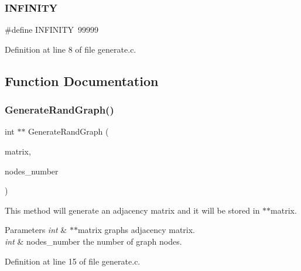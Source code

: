 \subsubsection{I\+N\+F\+I\+N\+I\+TY}
{\footnotesize\ttfamily \#define I\+N\+F\+I\+N\+I\+TY~99999}



Definition at line 8 of file generate.\+c.



\subsection{Function Documentation}
\mbox{\label{generate_8c_ae9f3169bfb4eb4fe0cf4032e32367c98}} 
\subsubsection{Generate\+Rand\+Graph()}
{\footnotesize\ttfamily int $\ast$$\ast$ Generate\+Rand\+Graph (\begin{DoxyParamCaption}\item[{int $\ast$$\ast$}]{matrix,  }\item[{int $\ast$}]{nodes\+\_\+number }\end{DoxyParamCaption})}



This method will generate an adjacency matrix and it will be stored in $\ast$$\ast$matrix. 


\begin{DoxyParams}{Parameters}
{\em int} & $\ast$$\ast$matrix graph\textquotesingle{}s adjacency matrix. \\
\hline
{\em int} & nodes\+\_\+number the number of graph nodes. \\
\hline
\end{DoxyParams}


Definition at line 15 of file generate.\+c.

